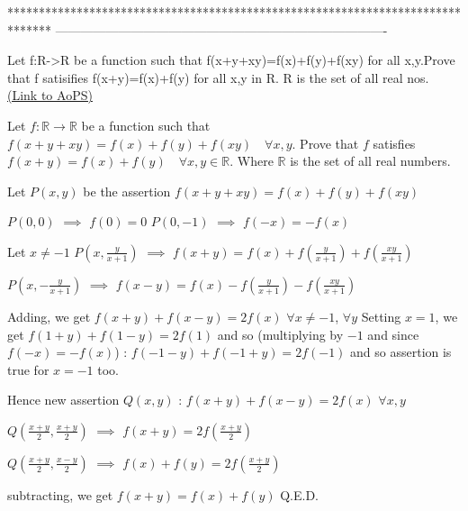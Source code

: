 *******************************************************************************
-------------------------------------------------------------------------------

\begin{problem}
	Let f:R->R be a function such that f(x+y+xy)=f(x)+f(y)+f(xy) for all x,y.Prove that f satisifies f(x+y)=f(x)+f(y) for all x,y in R. R is the set of all real nos.
	\flushright \href{https://artofproblemsolving.com/community/c6h561279}{(Link to AoPS)}
\end{problem}



\begin{solution}
	\begin{tcolorbox}Let $f:\mathbb{R}\to\mathbb{R}$ be a function such that $f(x+y+xy)=f(x)+f(y)+f(xy)\quad \forall x,y$. Prove that $f$ satisfies $f(x+y)=f(x)+f(y)\quad \forall x,y \in \mathbb{R}$. Where $\mathbb{R}$ is the set of all real numbers.\end{tcolorbox}
Let $P(x,y)$ be the assertion $f(x+y+xy)=f(x)+f(y)+f(xy)$

$P(0,0)$ $\implies$ $f(0)=0$
$P(0,-1)$ $\implies$ $f(-x)=-f(x)$

Let $x\ne -1$
$P(x,\frac y{x+1})$ $\implies$ $f(x+y)=f(x)+f(\frac y{x+1})+f(\frac{xy}{x+1})$

$P(x,-\frac y{x+1})$ $\implies$ $f(x-y)=f(x)-f(\frac y{x+1})-f(\frac{xy}{x+1})$

Adding, we get $f(x+y)+f(x-y)=2f(x)$ $\forall x\ne -1$, $\forall y$
Setting $x=1$, we get $f(1+y)+f(1-y)=2f(1)$ and so (multiplying by $-1$ and since $f(-x)=-f(x)$) :
$f(-1-y)+f(-1+y)=2f(-1)$ and so assertion is true for $x=-1$ too.

Hence new assertion $Q(x,y)$ : $f(x+y)+f(x-y)=2f(x)$ $\forall x,y$

$Q(\frac{x+y}2,\frac{x+y}2)$ $\implies$ $f(x+y)=2f(\frac{x+y}2)$

$Q(\frac{x+y}2,\frac{x-y}2)$ $\implies$ $f(x)+f(y)=2f(\frac{x+y}2)$

subtracting, we get $f(x+y)=f(x)+f(y)$
Q.E.D.
\end{solution}



